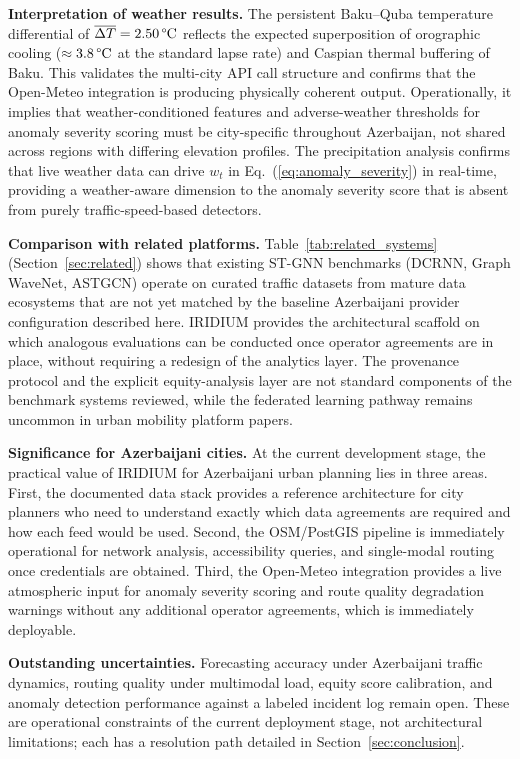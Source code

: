 \textbf{Interpretation of weather results.}
The persistent Baku--Quba temperature differential of
$\overline{\Delta T} = 2.50\,\text{\textdegree{}C}$ reflects the expected
superposition of orographic cooling ($\approx 3.8\,\text{\textdegree{}C}$
at the standard lapse rate) and Caspian thermal buffering of Baku.
This validates the multi-city API call structure and confirms that the
Open-Meteo integration is producing physically coherent output.
Operationally, it implies that weather-conditioned features and
adverse-weather thresholds for anomaly severity scoring must be
city-specific throughout Azerbaijan, not shared across regions with
differing elevation profiles.
The precipitation analysis confirms that live weather data can drive
$w_t$ in Eq.~(\ref{eq:anomaly_severity}) in real-time, providing
a weather-aware dimension to the anomaly severity score that is absent
from purely traffic-speed-based detectors.

\textbf{Comparison with related platforms.}
Table~\ref{tab:related_systems} (Section~\ref{sec:related}) shows that
existing ST-GNN benchmarks (DCRNN, Graph WaveNet, ASTGCN) operate on
curated traffic datasets from mature data ecosystems that are not yet
matched by the baseline Azerbaijani provider configuration described here.
IRIDIUM provides the architectural scaffold on which analogous evaluations
can be conducted once operator agreements are in place, without requiring
a redesign of the analytics layer.
The provenance protocol and the explicit equity-analysis layer are not
standard components of the benchmark systems reviewed, while the federated
learning pathway remains uncommon in urban mobility platform papers.

\textbf{Significance for Azerbaijani cities.}
At the current development stage, the practical value of IRIDIUM for
Azerbaijani urban planning lies in three areas.
First, the documented data stack provides a reference architecture for
city planners who need to understand exactly which data agreements are
required and how each feed would be used.
Second, the OSM/PostGIS pipeline is immediately operational for network
analysis, accessibility queries, and single-modal routing once credentials
are obtained.
Third, the Open-Meteo integration provides a live atmospheric input for
anomaly severity scoring and route quality degradation warnings without
any additional operator agreements, which is immediately deployable.

\textbf{Outstanding uncertainties.}
Forecasting accuracy under Azerbaijani traffic dynamics, routing quality
under multimodal load, equity score calibration, and anomaly detection
performance against a labeled incident log remain open.
These are operational constraints of the current deployment stage,
not architectural limitations; each has a resolution path detailed in
Section~\ref{sec:conclusion}.
